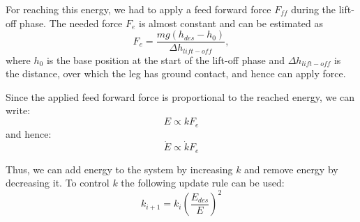 \documentclass[onecolumn, letter paper]{report}
\begin{document}
For reaching this energy, we had to apply a feed forward force $F_{ff}$ during the lift-off phase. 
The needed force $F_e$ is almost constant and can be estimated as
\begin{equation}
    F_e = \frac{m g (h_{des}-h_{0})}{\Delta h_{lift-off}},
\end{equation}
where $h_{0}$ is the base position at the start of the lift-off phase and $\Delta h_{lift-off}$ is the distance, over which the leg has ground contact, and hence can apply force.

Since the applied feed forward force is proportional to the reached energy, we can write:
\begin{equation}
    E \propto k F_e
\end{equation}
and hence:
\begin{equation}
    \dot E \propto \dot k F_e
\end{equation}

Thus, we can add energy to the system by increasing $k$ and remove energy by decreasing it. To control $k$ the following update rule can be used:
\begin{equation}
    k_{i+1} = k_{i}  (\frac{E_{des}}{E})^2
\end{equation}

  


\end{document}
